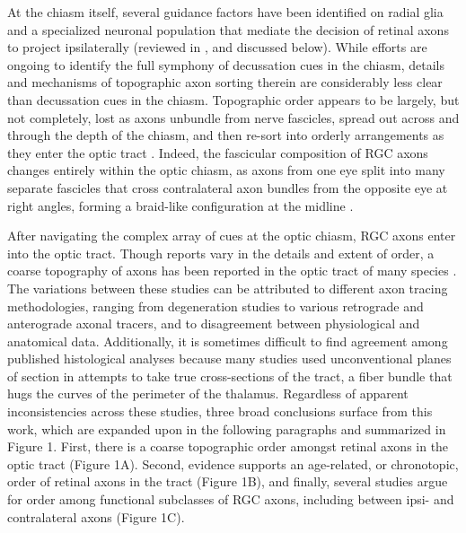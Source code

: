 At the chiasm itself, several guidance factors have been identified on radial glia and a specialized neuronal population that mediate the decision of retinal axons to project ipsilaterally (reviewed in \cite{petros2008retinal}, and discussed below).
While efforts are ongoing to identify the full symphony of decussation cues in the chiasm, details and mechanisms of topographic axon sorting therein are considerably less clear than decussation cues in the chiasm.
Topographic order appears to be largely, but not completely, lost as axons unbundle from nerve fascicles, spread out across and through the depth of the chiasm, and then re-sort into orderly arrangements as they enter the optic tract \cite{chan1999changes,chan1994changes}.
Indeed, the fascicular composition of RGC axons changes entirely within the optic chiasm, as axons from one eye split into many separate fascicles that cross contralateral axon bundles from the opposite eye at right angles, forming a braid-like configuration at the midline \cite{colello1998changing}.

After navigating the complex array of cues at the optic chiasm, RGC axons enter into the optic tract.
Though reports vary in the details and extent of order, a coarse topography of axons has been reported in the optic tract of many species \cite{chan1999changes,chan1994changes,plas2005pretarget,reese1993reestablishment,reh1983organization,torrealba1982studies}.
The variations between these studies can be attributed to different axon tracing methodologies, ranging from degeneration studies to various retrograde and anterograde axonal tracers, and to disagreement between physiological and anatomical data.
Additionally, it is sometimes difficult to find agreement among published histological analyses because many studies used unconventional planes of section in attempts to take true cross-sections of the tract, a fiber bundle that hugs the curves of the perimeter of the thalamus.
Regardless of apparent inconsistencies across these studies, three broad conclusions surface from this work, which are expanded upon in the following paragraphs and summarized in Figure 1.
First, there is a coarse topographic order amongst retinal axons in the optic tract (Figure 1A).
Second, evidence supports an age-related, or chronotopic, order of retinal axons in the tract (Figure 1B), and finally, several studies argue for order among functional subclasses of RGC axons, including between ipsi- and contralateral axons (Figure 1C).

